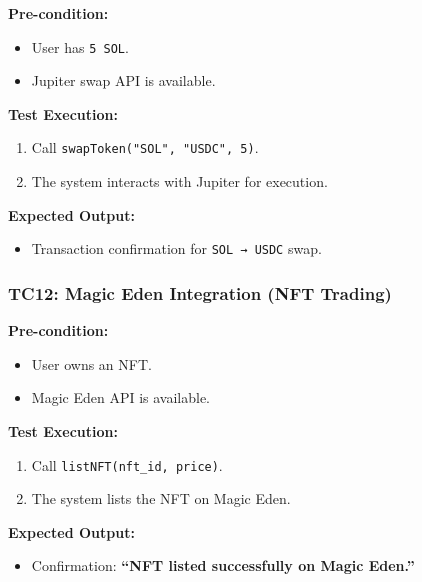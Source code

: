 \documentclass[
]{article}
\providecommand{\tightlist}{%
  \setlength{\itemsep}{0pt}\setlength{\parskip}{0pt}}
\begin{document}
\textbf{Pre-condition:}

\begin{itemize}
\tightlist
\item
  User has \texttt{5\ SOL}.
\item
  Jupiter swap API is available.
\end{itemize}

\textbf{Test Execution:}

\begin{enumerate}
\def\labelenumi{\arabic{enumi}.}
\tightlist
\item
  Call \texttt{swapToken("SOL",\ "USDC",\ 5)}.
\item
  The system interacts with Jupiter for execution.
\end{enumerate}

\textbf{Expected Output:}

\begin{itemize}
\tightlist
\item
  Transaction confirmation for \texttt{SOL\ →\ USDC} swap.
\end{itemize}

\hypertarget{tc12-magic-eden-integration-nft-trading}{%
\subsubsection{\texorpdfstring{\textbf{TC12: Magic Eden Integration (NFT
Trading)}}{TC12: Magic Eden Integration (NFT Trading)}}\label{tc12-magic-eden-integration-nft-trading}}

\textbf{Pre-condition:}

\begin{itemize}
\tightlist
\item
  User owns an NFT.
\item
  Magic Eden API is available.
\end{itemize}

\textbf{Test Execution:}

\begin{enumerate}
\def\labelenumi{\arabic{enumi}.}
\tightlist
\item
  Call \texttt{listNFT(nft\_id,\ price)}.
\item
  The system lists the NFT on Magic Eden.
\end{enumerate}

\textbf{Expected Output:}

\begin{itemize}
\tightlist
\item
  Confirmation: \textbf{``NFT listed successfully on Magic Eden.''}
\end{itemize}
\end{document}

